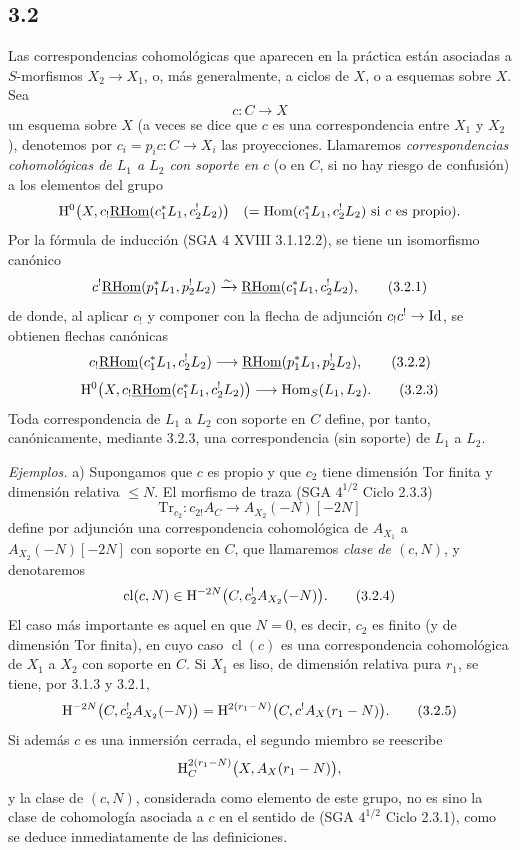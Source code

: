 \subsection*{3.2}
Las correspondencias cohomológicas que aparecen en la práctica están asociadas a $S$-morfismos $X_2\to X_1$, o, más generalmente, a ciclos de $X$, o a esquemas sobre $X$. Sea
\[
c:C\longrightarrow X
\]
un esquema sobre $X$ (a veces se dice que $c$ es una correspondencia entre $X_1$ y $X_2$), denotemos por $c_i=p_ic:C\to X_i$ las proyecciones. Llamaremos \emph{correspondencias cohomológicas de $L_1$ a $L_2$ con soporte en $c$} (o en $C$, si no hay riesgo de confusión) a los elementos del grupo
\[
\mathrm{H}^0\bigl(X,c_!\underline{\mathrm{RHom}}(c_1^*L_1,c_2^!L_2)\bigr)
\quad(=\operatorname{Hom}(c_1^*L_1,c_2^!L_2)\text{ si }c\text{ es propio}).
\]
Por la fórmula de inducción (SGA 4 XVIII 3.1.12.2), se tiene un isomorfismo canónico
\begin{equation}
c^!\underline{\mathrm{RHom}}(p_1^*L_1,p_2^!L_2)
\xrightarrow{\sim}
\underline{\mathrm{RHom}}(c_1^*L_1,c_2^!L_2),
\tag{3.2.1}
\end{equation}
de donde, al aplicar $c_!$ y componer con la flecha de adjunción $c_!c^!\to \mathrm{Id}$, se obtienen flechas canónicas
\begin{equation}
c_!\underline{\mathrm{RHom}}(c_1^*L_1,c_2^!L_2)
\longrightarrow
\underline{\mathrm{RHom}}(p_1^*L_1,p_2^!L_2),
\tag{3.2.2}
\end{equation}
\begin{equation}
\mathrm{H}^0\bigl(X,c_!\underline{\mathrm{RHom}}(c_1^*L_1,c_2^!L_2)\bigr)
\longrightarrow
\operatorname{Hom}_S(L_1,L_2).
\tag{3.2.3}
\end{equation}
Toda correspondencia de $L_1$ a $L_2$ con soporte en $C$ define, por tanto, canónicamente, mediante 3.2.3, una correspondencia (sin soporte) de $L_1$ a $L_2$.

\emph{Ejemplos.} a) Supongamos que $c$ es propio y que $c_2$ tiene dimensión Tor finita y dimensión relativa $\leq N$. El morfismo de traza (SGA $4^{1/2}$ Ciclo 2.3.3)
\[
\mathrm{Tr}_{c_2}:c_{2!}A_C\longrightarrow A_{X_2}(-N)[-2N]
\]
define por adjunción una correspondencia cohomológica de $A_{X_1}$ a $A_{X_2}(-N)[-2N]$ con soporte en $C$, que llamaremos \emph{clase de $(c,N)$}, y denotaremos
\begin{equation}
\operatorname{cl}(c,N)\in \mathrm{H}^{-2N}\bigl(C,c_2^!A_{X_2}(-N)\bigr).
\tag{3.2.4}
\end{equation}
El caso más importante es aquel en que $N=0$, es decir, $c_2$ es finito (y de dimensión Tor finita), en cuyo caso $\operatorname{cl}(c)$ es una correspondencia cohomológica de $X_1$ a $X_2$ con soporte en $C$. Si $X_1$ es liso, de dimensión relativa pura $r_1$, se tiene, por 3.1.3 y 3.2.1,
\begin{equation}
\mathrm{H}^{-2N}\bigl(C,c_2^!A_{X_2}(-N)\bigr)
=
\mathrm{H}^{2(r_1-N)}\bigl(C,c^!A_X(r_1-N)\bigr).
\tag{3.2.5}
\end{equation}
Si además $c$ es una inmersión cerrada, el segundo miembro se reescribe
\[
\mathrm{H}^{2(r_1-N)}_C\bigl(X,A_X(r_1-N)\bigr),
\]
y la clase de $(c,N)$, considerada como elemento de este grupo, no es sino la clase de cohomología asociada a $c$ en el sentido de (SGA $4^{1/2}$ Ciclo 2.3.1), como se deduce inmediatamente de las definiciones.

